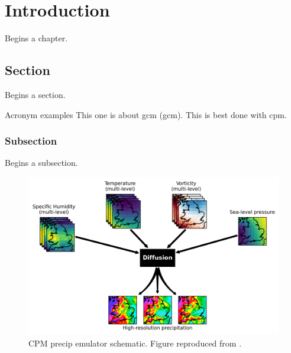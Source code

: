 \let\textcircled=\pgftextcircled
\chapter{Introduction}
\label{chap:intro}

Begins a chapter.

\section{Section}
\label{sec:sec01}

Begins a section.

Acronym examples This one is about \acrlong{gcm} (\acrshort{gcm}). This is best done with \acrfull{cpm}.

\subsection{Subsection}
\label{subsec:subsec01}

Begins a subsection.

\begin{figure}[t!]
	\centering
	\includegraphics[height=0.35\textheight]{chapters/fig01/ai-schematic.png}
	\caption{CPM precip emulator schematic. Figure reproduced from \cite{Addison2024diffcpmprecipemul}.}
	\label{fig:RHP02}
\end{figure}
